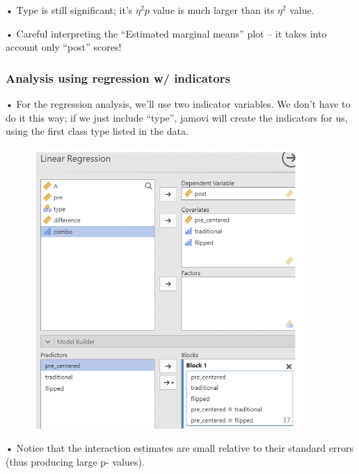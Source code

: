 \documentclass[
  letterpaper,
  DIV=11,
  numbers=noendperiod]{scrreprt}
\begin{document}
• Type is still significant; it's \(\eta^2p\) value is much larger than
its \(\eta^2\) value.

• Careful interpreting the ``Estimated marginal means'' plot -- it takes
into account only ``post'' scores!

\hypertarget{analysis-using-regression-w-indicators}{%
\subsubsection{Analysis using regression w/
indicators}\label{analysis-using-regression-w-indicators}}

• For the regression analysis, we'll use two indicator variables. We
don't have to do it this way; if we just include ``type'', jamovi will
create the indicators for us, using the first class type listed in the
data.

\begin{figure}

{\centering \includegraphics[width=4.05208in,height=\textheight]{images/Mod5_23.png}

}

\end{figure}

• Notice that the interaction estimates are small relative to their
standard errors (thus producing large p- values).
\end{document}
